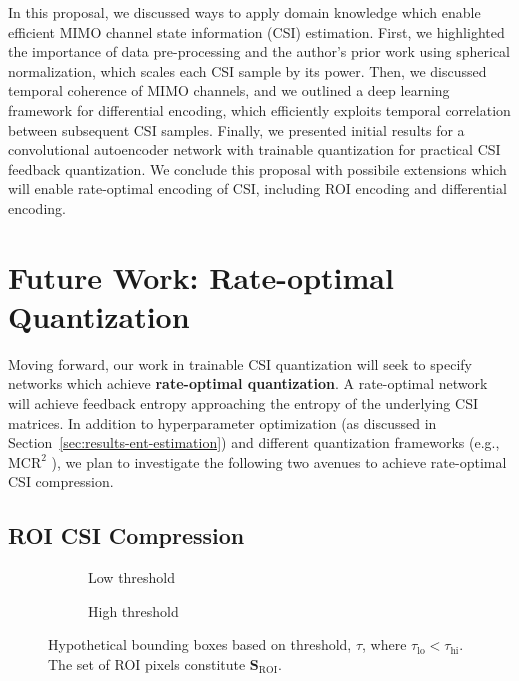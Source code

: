 
In this proposal, we discussed ways to apply domain knowledge which enable efficient MIMO channel state information (CSI) estimation. First, we highlighted the importance of data pre-processing and the author's prior work using spherical normalization, which scales each CSI sample by its power. Then, we discussed temporal coherence of MIMO channels, and we outlined a deep learning framework for differential encoding, which efficiently exploits temporal correlation between subsequent CSI samples. Finally, we presented initial results for a convolutional autoencoder network with trainable quantization for practical CSI feedback quantization. We conclude this proposal with possibile extensions which will enable rate-optimal encoding of CSI, including ROI encoding and differential encoding.

\section{Future Work: Rate-optimal Quantization}

Moving forward, our work in trainable CSI quantization will seek to specify networks which achieve \textbf{rate-optimal quantization}. A rate-optimal network will achieve feedback entropy approaching the entropy of the underlying CSI matrices. In addition to hyperparameter optimization (as discussed in Section~\ref{sec:results-ent-estimation}) and different quantization frameworks (e.g., $\text{MCR}^2$ \cite{ref:Yu2020MCR2}), we plan to investigate the following two avenues to achieve rate-optimal CSI compression.

\subsection{ROI CSI Compression}

\begin{figure}[htb] \centering 
	\begin{subfigure}[t]{.48\textwidth}
		
		\caption{Low threshold} 
		\label{fig:roi-lo} 
	\end{subfigure}
	\begin{subfigure}[t]{.48\textwidth}
		
		\caption{High threshold} 
		\label{fig:roi-hi} 
	\end{subfigure}
	\caption{Hypothetical bounding boxes based on threshold, $\tau$, where $\tau_{\text{lo}} < \tau_{\text{hi}}$. The set of ROI pixels constitute $\mathbf S_{\text{ROI}}$.} 
  	\label{fig:roi-thresh} 
\end{figure}

